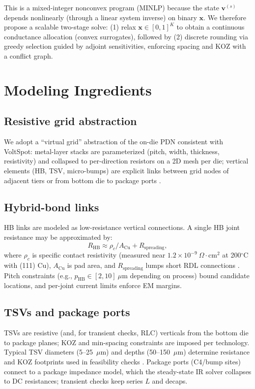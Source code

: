 \documentclass[conference]{IEEEtran}
\begin{document}
This is a mixed-integer nonconvex program (MINLP) because the state $\bm{v}^{(s)}$ depends nonlinearly (through a linear system inverse) on binary $\bm{x}$. We therefore propose a scalable two-stage solve: (1) relax $\bm{x}\in [0,1]^K$ to obtain a continuous conductance allocation (convex surrogates), followed by (2) discrete rounding via greedy selection guided by adjoint sensitivities, enforcing spacing and KOZ with a conflict graph.

\section{Modeling Ingredients}
\subsection{Resistive grid abstraction}
We adopt a ``virtual grid'' abstraction of the on-die PDN consistent with VoltSpot: metal-layer stacks are parameterized (pitch, width, thickness, resistivity) and collapsed to per-direction resistors on a 2D mesh per die; vertical elements (HB, TSV, micro-bumps) are explicit links between grid nodes of adjacent tiers or from bottom die to package ports \cite{VoltSpotHOWTO,VoltSpot}.

\subsection{Hybrid-bond links}
HB links are modeled as low-resistance vertical connections. A single HB joint resistance may be approximated by:
\begin{equation}
  R_{\text{HB}} \approx \rho_c/A_{\text{Cu}} + R_{\text{spreading}},
\end{equation}
where $\rho_c$ is specific contact resistivity (measured near $1.2\times 10^{-9}\ \Omega\cdot\mathrm{cm}^2$ at 200$^\circ$C with (111) Cu), $A_{\text{Cu}}$ is pad area, and $R_{\text{spreading}}$ lumps short RDL connections \cite{HBContact2022}. Pitch constraints (e.g., $p_{\text{HB}}\in[2,10]\ \mu$m depending on process) bound candidate locations, and per-joint current limits enforce EM margins.

\subsection{TSVs and package ports}
TSVs are resistive (and, for transient checks, RLC) verticals from the bottom die to package planes; KOZ and min-spacing constraints are imposed per technology. Typical TSV diameters (5--25~$\mu$m) and depths (50--150~$\mu$m) determine resistance and KOZ footprints used in feasibility checks \cite{KOZPatent}. Package ports (C4/bump sites) connect to a package impedance model, which the steady-state IR solver collapses to DC resistances; transient checks keep series $L$ and decaps.
\end{document}
